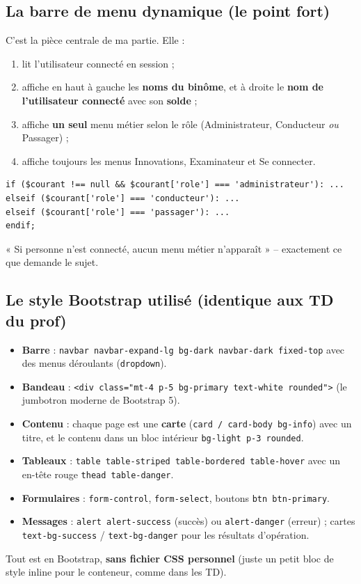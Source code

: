 \documentclass[11pt,a4paper]{article}
\begin{document}
\subsection{La barre de menu dynamique (le point fort)}
C'est la pièce centrale de ma partie. Elle :
\begin{enumerate}[noitemsep]
  \item lit l'utilisateur connecté en session ;
  \item affiche en haut à gauche les \textbf{noms du binôme}, et à droite le
        \textbf{nom de l'utilisateur connecté} avec son \textbf{solde} ;
  \item affiche \textbf{un seul} menu métier selon le rôle (Administrateur,
        Conducteur \emph{ou} Passager) ;
  \item affiche toujours les menus Innovations, Examinateur et Se connecter.
\end{enumerate}
\begin{lstlisting}
if ($courant !== null && $courant['role'] === 'administrateur'): ...
elseif ($courant['role'] === 'conducteur'): ...
elseif ($courant['role'] === 'passager'): ...
endif;
\end{lstlisting}
« Si personne n'est connecté, aucun menu métier n'apparaît » -- exactement ce que
demande le sujet.

\subsection{Le style Bootstrap utilisé (identique aux TD du prof)}
\begin{itemize}[noitemsep]
  \item \textbf{Barre} : \texttt{navbar navbar-expand-lg bg-dark navbar-dark
        fixed-top} avec des menus déroulants (\texttt{dropdown}).
  \item \textbf{Bandeau} : \texttt{<div class="mt-4 p-5 bg-primary text-white
        rounded">} (le jumbotron moderne de Bootstrap 5).
  \item \textbf{Contenu} : chaque page est une \textbf{carte}
        (\texttt{card / card-body bg-info}) avec un titre, et le contenu dans un
        bloc intérieur \texttt{bg-light p-3 rounded}.
  \item \textbf{Tableaux} : \texttt{table table-striped table-bordered
        table-hover} avec un en-tête rouge \texttt{thead table-danger}.
  \item \textbf{Formulaires} : \texttt{form-control}, \texttt{form-select},
        boutons \texttt{btn btn-primary}.
  \item \textbf{Messages} : \texttt{alert alert-success} (succès) ou
        \texttt{alert-danger} (erreur) ; cartes \texttt{text-bg-success} /
        \texttt{text-bg-danger} pour les résultats d'opération.
\end{itemize}
Tout est en Bootstrap, \textbf{sans fichier CSS personnel} (juste un petit bloc de
style inline pour le conteneur, comme dans les TD).
\end{document}
